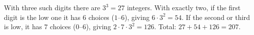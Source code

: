 With three such digits there are $3^3=27$ integers. With exactly two, if the first digit is the low one it has $6$ choices ($1$--$6$), giving $6\cdot3^2=54$. If the second or third is low, it has $7$ choices ($0$--$6$), giving $2\cdot7\cdot3^2=126$. Total: $27+54+126=\boxed{207}$.
